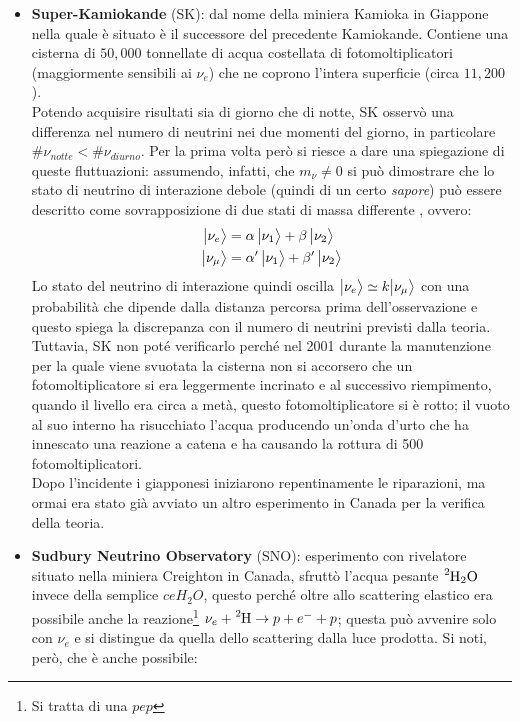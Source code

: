 \begin{itemize}
    \item \textbf{Super-Kamiokande} (SK): dal nome della miniera Kamioka in Giappone nella quale è situato è il successore del precedente Kamiokande. Contiene una cisterna di $50,000$ tonnellate di acqua costellata di fotomoltiplicatori (maggiormente sensibili ai $\nu_e$) che ne coprono l'intera superficie (circa $11,200$). \\
    Potendo acquisire risultati sia di giorno che di notte, SK osservò una differenza nel numero di neutrini nei due momenti del giorno, in particolare $\#\nu_{notte}<\#\nu_{diurno}$. Per la prima volta però si riesce a dare una spiegazione di queste fluttuazioni: assumendo, infatti, che $m_\nu\not = 0$ si può dimostrare che lo stato di neutrino di interazione debole (quindi di un certo \textit{sapore}) può essere descritto come sovrapposizione di due stati di massa differente %
    , ovvero:
    \begin{displaymath}
    \begin{aligned}
    \bigl | \nu_e \bigr \rangle &= \alpha\, \bigl | \nu_1 \bigr \rangle + \beta\, \bigl | \nu_2 \bigr \rangle\\
    \bigl | \nu_\mu \bigr \rangle &= \alpha'\, \bigl | \nu_1 \bigr \rangle + \beta'\, \bigl | \nu_2 \bigr \rangle
    \end{aligned}
    \end{displaymath}
    Lo stato del neutrino di interazione quindi oscilla $\bigl | \nu_e \bigr \rangle\simeq k \bigl | \nu_\mu \bigr \rangle$ con una probabilità che dipende dalla distanza percorsa prima dell'osservazione e questo spiega la discrepanza con il numero di neutrini previsti dalla teoria. Tuttavia, SK non poté verificarlo perché nel 2001 durante la manutenzione per la quale viene svuotata la cisterna non si accorsero che un fotomoltiplicatore si era leggermente incrinato e al successivo riempimento, quando il livello era circa a metà, questo fotomoltiplicatore si è rotto; il vuoto al suo interno ha risucchiato l'acqua producendo un'onda d'urto che ha innescato una reazione a catena e ha causando la rottura di 500 fotomoltiplicatori.\\
    Dopo l'incidente i giapponesi iniziarono repentinamente le riparazioni, ma ormai era stato già avviato un altro esperimento in Canada per la verifica della teoria.
    \item \textbf{Sudbury Neutrino Observatory} (SNO): esperimento con rivelatore \cherenkov{} situato nella miniera Creighton in Canada, sfruttò l'acqua pesante $\ce{^2H_2O}$ invece della semplice $ce{H_2O}$, questo perché oltre allo scattering elastico era possibile anche la reazione\footnote{Si tratta di una $pep$ } $\nu_e + \ce{^2H} \to p+e^-+p$; questa può avvenire solo con $\nu_e$ e si distingue da quella dello scattering dalla luce \cherenkov{} prodotta. Si noti, però, che è anche possibile:

\end{itemize}
